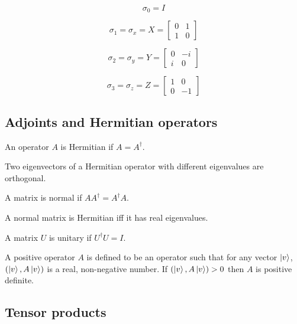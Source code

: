 \documentclass{article}
\begin{document}
\[
  \sigma_0=I
\]

\[
  \sigma_1=\sigma_x=X=
  \begin{bmatrix}
    0&1 \\
    1&0
  \end{bmatrix}
\]

\[
  \sigma_2=\sigma_y=Y=
  \begin{bmatrix}
    0&-i \\
    i&0
  \end{bmatrix}
\]

\[
  \sigma_3=\sigma_z=Z=
  \begin{bmatrix}
    1&0 \\
    0&-1
  \end{bmatrix}
\]

\setcounter{subsection}{5}
\subsection{Adjoints and Hermitian operators}

\begin{definition}[Hermitian]
  An operator $A$ is Hermitian if $A=A^\dagger$.
\end{definition}

\begin{theorem}
  Two eigenvectors of a Hermitian operator with different eigenvalues are orthogonal.
\end{theorem}

\begin{definition}
  A matrix is normal if $AA^\dagger=A^\dagger A$.
\end{definition}

\begin{theorem}
  A normal matrix is Hermitian iff it has real eigenvalues.
\end{theorem}

\begin{definition}[Unitary]
  A matrix $U$ is unitary if $U^\dagger U=I$.
\end{definition}

\begin{definition}
  A positive operator $A$ is defined to be an operator
  such that for any vector $\ket{v}$, $(\ket{v},A\ket{v})$
  is a real, non-negative number. If $(\ket{v}, A\ket{v})>0$
  then $A$ is positive definite.
\end{definition}

\subsection{Tensor products}
\end{document}
